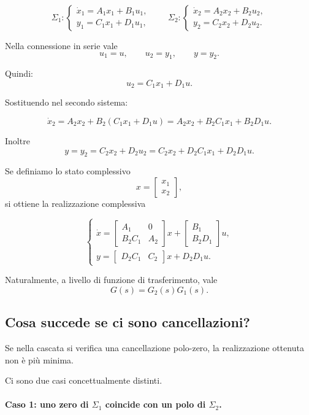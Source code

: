 \[
\Sigma_1:
\begin{cases}
\dot x_1=A_1x_1+B_1u_1,\\
y_1=C_1x_1+D_1u_1,
\end{cases}
\qquad
\Sigma_2:
\begin{cases}
\dot x_2=A_2x_2+B_2u_2,\\
y_2=C_2x_2+D_2u_2.
\end{cases}
\]

Nella connessione in serie vale
\[
u_1=u,\qquad u_2=y_1,\qquad y=y_2.
\]

Quindi:
\[
u_2=C_1x_1+D_1u.
\]

Sostituendo nel secondo sistema:

\[
\dot x_2=A_2x_2+B_2(C_1x_1+D_1u)
      =A_2x_2+B_2C_1x_1+B_2D_1u.
\]

Inoltre
\[
y=y_2=C_2x_2+D_2u_2
     =C_2x_2+D_2C_1x_1+D_2D_1u.
\]

Se definiamo lo stato complessivo
\[
x=\begin{bmatrix}x_1\\x_2\end{bmatrix},
\]
si ottiene la realizzazione complessiva

\[
\begin{cases}
\dot x=
\begin{bmatrix}
A_1 & 0\\
B_2C_1 & A_2
\end{bmatrix}x+
\begin{bmatrix}
B_1\\
B_2D_1
\end{bmatrix}u,\\[1.2em]
y=
\begin{bmatrix}
D_2C_1 & C_2
\end{bmatrix}x+D_2D_1u.
\end{cases}
\]

Naturalmente, a livello di funzione di trasferimento, vale
\[
G(s)=G_2(s)G_1(s).
\]

\subsection{Cosa succede se ci sono cancellazioni?}

Se nella cascata si verifica una cancellazione polo-zero, la realizzazione ottenuta non è più minima.

Ci sono due casi concettualmente distinti.

\paragraph{Caso 1: uno zero di \(\Sigma_1\) coincide con un polo di \(\Sigma_2\).}

